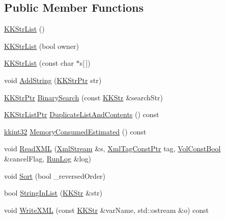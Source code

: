 \subsection*{Public Member Functions}
\begin{DoxyCompactItemize}
\item 
\hyperlink{class_k_k_b_1_1_k_k_str_list_ae8f27238b72887a795737931735ff802}{K\+K\+Str\+List} ()
\item 
\hyperlink{class_k_k_b_1_1_k_k_str_list_a35f0d495449b13e07a0fd8cc90b90b4c}{K\+K\+Str\+List} (bool owner)
\item 
\hyperlink{class_k_k_b_1_1_k_k_str_list_a1e6557c33b11dd3c3c4ff51a538d7353}{K\+K\+Str\+List} (const char $\ast$s\mbox{[}$\,$\mbox{]})
\item 
void \hyperlink{class_k_k_b_1_1_k_k_str_list_a0209f0a13bcd253c40108864b3804063}{Add\+String} (\hyperlink{namespace_k_k_b_a9adbef5a6b3be0867f5570df2a08f388}{K\+K\+Str\+Ptr} str)
\item 
\hyperlink{namespace_k_k_b_a9adbef5a6b3be0867f5570df2a08f388}{K\+K\+Str\+Ptr} \hyperlink{class_k_k_b_1_1_k_k_str_list_abfeb41d75fc3e285f7bdf65593f204a1}{Binary\+Search} (const \hyperlink{class_k_k_b_1_1_k_k_str}{K\+K\+Str} \&search\+Str)
\item 
\hyperlink{class_k_k_b_1_1_k_k_str_list_a466accb870aa75f4b47943932fccb4c8}{K\+K\+Str\+List\+Ptr} \hyperlink{class_k_k_b_1_1_k_k_str_list_a9316bb3167f82a9695b3b09e56545d12}{Duplicate\+List\+And\+Contents} () const 
\item 
\hyperlink{namespace_k_k_b_a8fa4952cc84fda1de4bec1fbdd8d5b1b}{kkint32} \hyperlink{class_k_k_b_1_1_k_k_str_list_a2e3450903dba55c8733e638c6916ba3d}{Memory\+Consumed\+Estimated} () const 
\item 
void \hyperlink{class_k_k_b_1_1_k_k_str_list_a0f573b4a2aa069d5dc5097f5f2fe8d15}{Read\+X\+ML} (\hyperlink{class_k_k_b_1_1_xml_stream}{Xml\+Stream} \&s, \hyperlink{namespace_k_k_b_a5f1b0b1667d79fec26deeff10c43df23}{Xml\+Tag\+Const\+Ptr} tag, \hyperlink{namespace_k_k_b_a7d390f568e2831fb76b86b56c87bf92f}{Vol\+Const\+Bool} \&cancel\+Flag, \hyperlink{class_k_k_b_1_1_run_log}{Run\+Log} \&log)
\item 
void \hyperlink{class_k_k_b_1_1_k_k_str_list_a239828772f41e47f3a136ea15e40f5d6}{Sort} (bool \+\_\+reversed\+Order)
\item 
bool \hyperlink{class_k_k_b_1_1_k_k_str_list_a7d5d3da0512d094034bd6203aaa3576f}{String\+In\+List} (\hyperlink{class_k_k_b_1_1_k_k_str}{K\+K\+Str} \&str)
\item 
void \hyperlink{class_k_k_b_1_1_k_k_str_list_aba21c9259253e8ae268ee13d5e0b3539}{Write\+X\+ML} (const \hyperlink{class_k_k_b_1_1_k_k_str}{K\+K\+Str} \&var\+Name, std\+::ostream \&o) const 
\end{DoxyCompactItemize}
